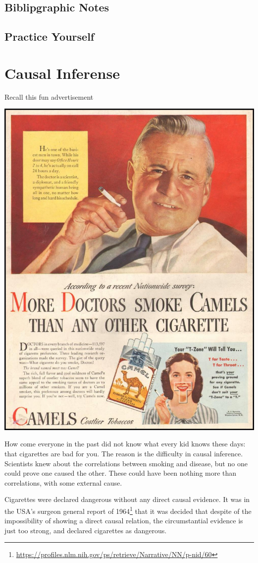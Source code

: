 \documentclass[]{book}
\renewcommand{\href}[2]{#2\footnote{\url{#1}}}
\theoremstyle{definition}
\theoremstyle{definition}
\theoremstyle{definition}
\theoremstyle{remark}
\begin{document}
\hypertarget{biblipgraphic-notes}{%
\section{Biblipgraphic Notes}\label{biblipgraphic-notes}}

\hypertarget{practice-yourself-17}{%
\section{Practice Yourself}\label{practice-yourself-17}}

\hypertarget{causality}{%
\chapter{Causal Inferense}\label{causality}}

Recall this fun advertisement

\includegraphics[width=0.5\linewidth]{art/wor}

How come everyone in the past did not know what every kid knows these days: that cigarettes are bad for you.
The reason is the difficulty in causal inference.
Scientists knew about the correlations between smoking and disease, but no one could prove one caused the other. These could have been nothing more than correlations, with some external cause.

Cigarettes were declared dangerous without any direct causal evidence.
It was in the USA's \href{https://profiles.nlm.nih.gov/ps/retrieve/Narrative/NN/p-nid/60}{surgeon general report of 1964} that it was decided that despite of the impossibility of showing a direct causal relation, the circumstantial evidence is just too strong, and declared cigarettes as dangerous.
\end{document}
